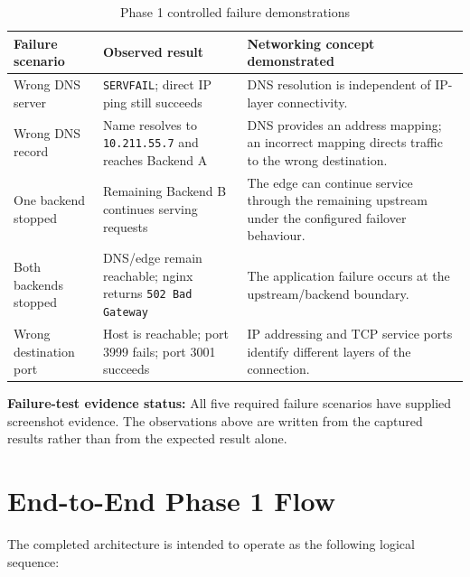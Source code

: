\documentclass[12pt,a4paper]{article}
\newcommand{\statusbox}[2]{%
\begin{tcolorbox}[colback=lightgray,colframe=bordergray,boxrule=0.5pt]
\textbf{#1:} #2
\end{tcolorbox}}
\begin{document}
\begin{table}[H]
\centering
\caption{Phase 1 controlled failure demonstrations}\label{tab:failure-demonstrations}
\begin{tabularx}{\textwidth}{@{}L{0.22\textwidth}L{0.25\textwidth}>{\RaggedRight\arraybackslash}X@{}}
\toprule
\textbf{Failure scenario} & \textbf{Observed result} & \textbf{Networking concept demonstrated}\\
\midrule
Wrong DNS server & \texttt{SERVFAIL}; direct IP ping still succeeds & DNS resolution is independent of IP-layer connectivity.\\
Wrong DNS record & Name resolves to \texttt{10.211.55.7} and reaches Backend A & DNS provides an address mapping; an incorrect mapping directs traffic to the wrong destination.\\
One backend stopped & Remaining Backend B continues serving requests & The edge can continue service through the remaining upstream under the configured failover behaviour.\\
Both backends stopped & DNS/edge remain reachable; nginx returns \texttt{502 Bad Gateway} & The application failure occurs at the upstream/backend boundary.\\
Wrong destination port & Host is reachable; port 3999 fails; port 3001 succeeds & IP addressing and TCP service ports identify different layers of the connection.\\
\bottomrule
\end{tabularx}
\end{table}

\statusbox{Failure-test evidence status}{All five required failure scenarios have supplied screenshot evidence. The observations above are written from the captured results rather than from the expected result alone.}

\section{End-to-End Phase 1 Flow}
The completed architecture is intended to operate as the following logical sequence:
\end{document}
